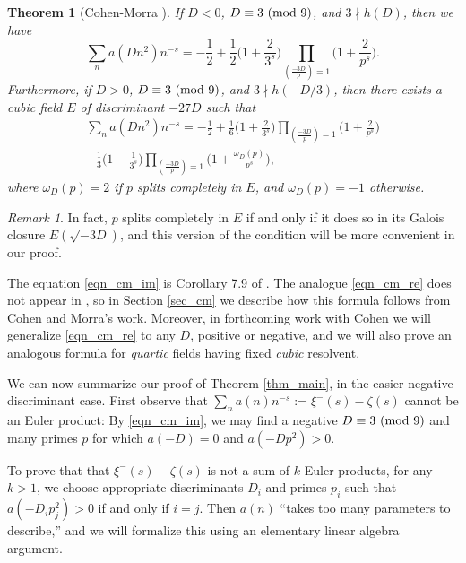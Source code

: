 \documentclass[12pt]{amsart}
\newtheorem{theorem}{Theorem}
\theoremstyle{remark}
\newtheorem*{remark}{Remark}
\numberwithin{theorem}{section} \numberwithin{equation}{section}
\newcommand{\textmod}{{\text {\rm mod}}}
\begin{document}
\begin{theorem}[Cohen-Morra \cite{CM}]\label{thm_cm}
If $D < 0$, $D \equiv 3 \ (\textmod \ 9)$, and $3 \nmid h(D)$, then we have
\begin{equation}\label{eqn_cm_im}
\sum_n a(Dn^2) n^{-s} = - \frac{1}{2} + \frac{1}{2} \bigg(1 + \frac{2}{3^s} \bigg)
\prod_{ \left( \frac{ -3D}{p} \right) = 1 } \bigg(1 + \frac{2}{p^s} \bigg).
\end{equation}
Furthermore, if $D > 0$, $D \equiv 3 \ (\textmod \ 9)$, 
and $3 \nmid h(-D/3)$, then there exists a cubic field $E$ of discriminant $-27 D$ such that
\begin{multline}\label{eqn_cm_re}
\sum_n a(Dn^2) n^{-s} =  - \frac{1}{2} + \frac{1}{6} \bigg(1 + \frac{2}{3^s} \bigg)
\prod_{ \left( \frac{ -3D}{p} \right) = 1 } \bigg(1 + \frac{2}{p^s} \bigg)
\\ 
+ \frac{1}{3} \bigg(1 - \frac{1}{3^s} \bigg)
\prod_{ \left( \frac{ -3D}{p} \right) = 1 } \bigg(1 + \frac{\omega_D(p)}{p^s} \bigg), \ \ \ \ \  \ \ \
\end{multline}
where $\omega_D(p) = 2$
if $p$ splits completely in $E$, and $\omega_D(p) = -1$ otherwise. 
\end{theorem}
\begin{remark}
In fact, $p$ splits completely in $E$ if and only if it does so in its Galois closure
$E(\sqrt{-3D})$, and this version of the condition will be more convenient in our proof.
\end{remark}

The equation \eqref{eqn_cm_im} is Corollary 7.9 of \cite{CM}. The analogue \eqref{eqn_cm_re}
does not appear in \cite{CM, M}, so in Section \ref{sec_cm} we describe how this formula follows from Cohen and Morra's
work. Moreover, in forthcoming work with Cohen \cite{CT} we will generalize \eqref{eqn_cm_re} to any $D$, positive or negative,
and we will also prove an analogous formula for {\itshape quartic} fields having fixed {\itshape cubic} resolvent.

We can now summarize our proof of Theorem \ref{thm_main}, in the
easier negative discriminant case. First observe that $\sum_n a(n) n^{-s} := \xi^-(s) - \zeta(s)$
cannot be an Euler product: By \eqref{eqn_cm_im}, we may find a negative 
$D \equiv 3 \ (\textmod \ 9)$ and many primes $p$ for which $a(-D) = 0$
and $a(-D p^2) > 0$.

To prove that
that $\xi^-(s) - \zeta(s)$ is not a sum of $k$ Euler products, for any $k > 1$, we choose appropriate
discriminants $D_i$ and primes $p_i$ such that
$a(-D_i p_j^2) > 0$ if and only if $i = j$. Then $a(n)$ ``takes too many parameters to describe,''
and we will formalize this using an elementary linear algebra argument.
\end{document}
